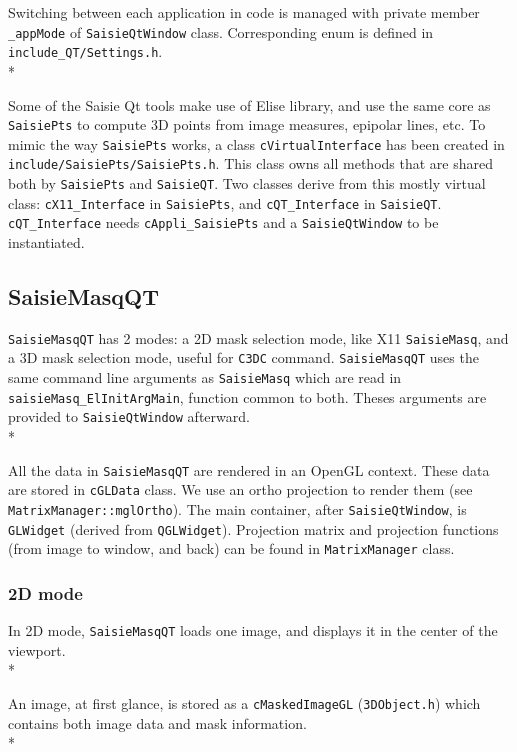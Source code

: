 \documentclass[a4paper]{book}
\begin{document}
Switching between each application in code is managed with private member {\tt \_appMode} of {\tt SaisieQtWindow} class. Corresponding enum is defined in {\tt include\_QT/Settings.h}.\\*

Some of the Saisie Qt tools make use of Elise library, and use the same core as {\tt SaisiePts} to compute 3D points from image measures, epipolar lines, etc. To mimic the way {\tt SaisiePts} works, a class {\tt cVirtualInterface} has been created in {\tt include/SaisiePts/SaisiePts.h}. This class owns all methods that are shared both by {\tt SaisiePts} and {\tt SaisieQT}. Two classes derive from this mostly virtual class: {\tt cX11\_Interface} in {\tt SaisiePts}, and {\tt cQT\_Interface} in {\tt SaisieQT}. {\tt cQT\_Interface} needs {\tt cAppli\_SaisiePts} and a {\tt SaisieQtWindow} to be instantiated.

\subsection{SaisieMasqQT}

{\tt SaisieMasqQT} has 2 modes: a 2D mask selection mode, like X11 {\tt SaisieMasq}, and a 3D mask selection mode, useful for {\tt C3DC} command. {\tt SaisieMasqQT} uses the same command line arguments as {\tt SaisieMasq} which are read in {\tt saisieMasq\_ElInitArgMain}, function common to both. Theses arguments are provided to {\tt SaisieQtWindow} afterward.\\*

All the data in {\tt SaisieMasqQT} are rendered in an OpenGL context. These data are stored in {\tt cGLData} class. We use an ortho projection to render them (see {\tt MatrixManager::mglOrtho}). The main container, after {\tt SaisieQtWindow}, is {\tt GLWidget} (derived from {\tt QGLWidget}). Projection matrix and projection functions (from image to window, and back) can be found in {\tt MatrixManager} class.

\subsubsection{2D mode}

In 2D mode, {\tt SaisieMasqQT} loads one image, and displays it in the center of the viewport.\\*

An image, at first glance, is stored as a {\tt cMaskedImageGL} ({\tt 3DObject.h}) which contains both image data and mask information.\\*
\end{document}
